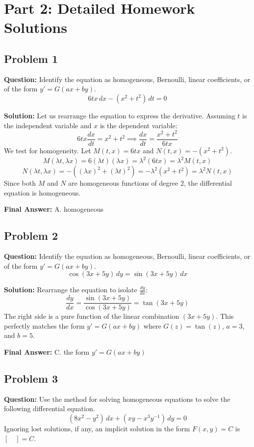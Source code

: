\documentclass[11pt]{article}
\begin{document}
\newpage
\section{Part 2: Detailed Homework Solutions}

\subsection*{Problem 1}
\textbf{Question:} Identify the equation as homogeneous, Bernoulli, linear coefficients, or of the form $y' = G(ax+by)$.
\[ 6tx \, dx - (x^2 + t^2) \, dt = 0 \]

\textbf{Solution:}
Let us rearrange the equation to express the derivative. Assuming $t$ is the independent variable and $x$ is the dependent variable:
\[ 6tx \frac{dx}{dt} = x^2 + t^2 \implies \frac{dx}{dt} = \frac{x^2 + t^2}{6tx} \]
We test for homogeneity. Let $M(t,x) = 6tx$ and $N(t,x) = -(x^2+t^2)$.
\[ M(\lambda t, \lambda x) = 6(\lambda t)(\lambda x) = \lambda^2 (6tx) = \lambda^2 M(t,x) \]
\[ N(\lambda t, \lambda x) = - ((\lambda x)^2 + (\lambda t)^2) = -\lambda^2(x^2+t^2) = \lambda^2 N(t,x) \]
Since both $M$ and $N$ are homogeneous functions of degree 2, the differential equation is homogeneous.

\textbf{Final Answer:} A. homogeneous

\vspace{0.5cm}
\subsection*{Problem 2}
\textbf{Question:} Identify the equation as homogeneous, Bernoulli, linear coefficients, or of the form $y' = G(ax+by)$.
\[ \cos(3x+5y) \, dy = \sin(3x+5y) \, dx \]

\textbf{Solution:}
Rearrange the equation to isolate $\frac{dy}{dx}$:
\[ \frac{dy}{dx} = \frac{\sin(3x+5y)}{\cos(3x+5y)} = \tan(3x+5y) \]
The right side is a pure function of the linear combination $(3x+5y)$. This perfectly matches the form $y' = G(ax+by)$ where $G(z) = \tan(z)$, $a=3$, and $b=5$.

\textbf{Final Answer:} C. the form $y' = G(ax+by)$

\vspace{0.5cm}
\subsection*{Problem 3}
\textbf{Question:} Use the method for solving homogeneous equations to solve the following differential equation.
\[ (8x^2 - y^2) \, dx + (xy - x^3y^{-1}) \, dy = 0 \]
Ignoring lost solutions, if any, an implicit solution in the form $F(x,y) = C$ is $[\quad] = C$.
\end{document}
